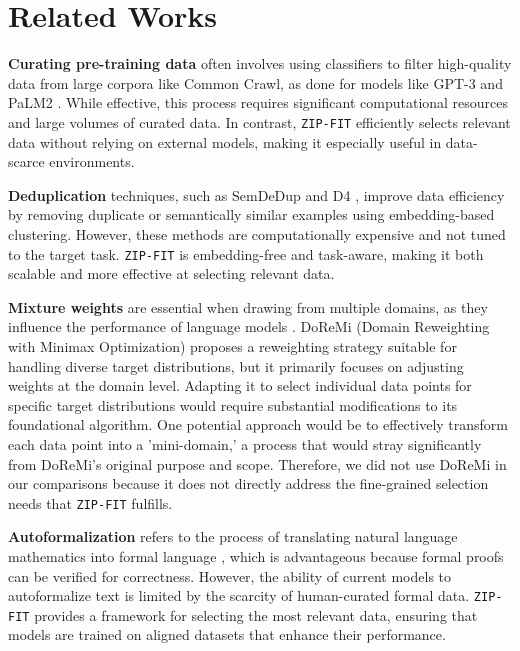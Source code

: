 \section{Related Works}

\textbf{Curating pre-training data} often involves using classifiers to filter high-quality data from large corpora like Common Crawl, as done for models like GPT-3 and PaLM2 \citep{brown2020languagemodelsfewshotlearners, palm2technicalreport2023, deepseekmath}. While effective, this process requires significant computational resources and large volumes of curated data. In contrast, \texttt{ZIP-FIT} efficiently selects relevant data without relying on external models, making it especially useful in data-scarce environments.

\textbf{Deduplication} techniques, such as SemDeDup \citep{semdedup} and D4 \citep{d4}, improve data efficiency by removing duplicate or semantically similar examples using embedding-based clustering. However, these methods are computationally expensive and not tuned to the target task. \texttt{ZIP-FIT} is embedding-free and task-aware, making it both scalable and more effective at selecting relevant data.

\textbf{Mixture weights} are essential when drawing from multiple domains, as they influence the performance of language models \citep{glamefficientscalinglanguage, dsir}. DoReMi (Domain Reweighting with Minimax Optimization) \citep{doremi} proposes a reweighting strategy suitable for handling diverse target distributions, but it primarily focuses on adjusting weights at the domain level. Adapting it to select individual data points for specific target distributions would require substantial modifications to its foundational algorithm. 
One potential approach would be to effectively transform each data point into a 'mini-domain,' a process that would stray significantly from DoReMi's original purpose and scope. 
Therefore, we did not use DoReMi in our comparisons because it does not directly address the fine-grained selection needs that \texttt{ZIP-FIT} fulfills. 

\textbf{Autoformalization} refers to the process of translating natural language mathematics into formal language \citep{Wang_2020, autoformalizationlargelanguagemodels}, which is advantageous because formal proofs can be verified for correctness. 
However, the ability of current models to autoformalize text is limited by the scarcity of human-curated formal data. \texttt{ZIP-FIT} provides a framework for selecting the most relevant data, ensuring that models are trained on aligned datasets that enhance their performance. 

